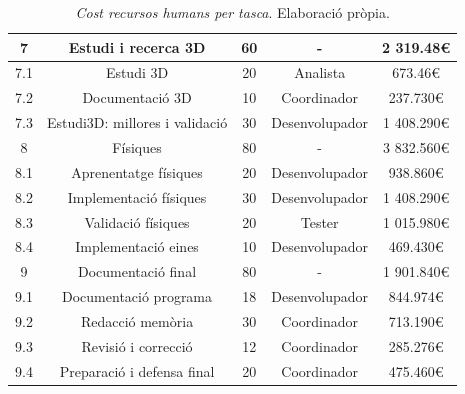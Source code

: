 \documentclass[a4paper]{article} %
\begin{document}
\begin{table}[h!]
\begin{tabular}{|| c | c || c | c | c ||}
			7 & Estudi i recerca 3D & 60 & - & 2 319.48\euro \\
			\hline
			7.1 & Estudi 3D & 20 & Analista & 673.46\euro \\ 
			7.2 & Documentació 3D & 10 & Coordinador & 237.730\euro \\
			7.3 & Estudi3D: millores i validació & 30 & Desenvolupador & 1 408.290\euro \\
			\hline \hline
			8 & Físiques & 80 &  - & 3 832.560\euro \\
			\hline
			8.1 & Aprenentatge físiques & 20 & Desenvolupador & 938.860\euro \\
			8.2 & Implementació físiques & 30 & Desenvolupador & 1 408.290\euro \\
			8.3 & Validació físiques & 20 & Tester & 1 015.980\euro \\
			8.4 & Implementació eines & 10 & Desenvolupador & 469.430\euro \\
			\hline \hline
			9 & Documentació final & 80 & - & 1 901.840\euro \\
			\hline
			9.1 & Documentació programa & 18 & Desenvolupador & 844.974\euro \\
			9.2 & Redacció memòria & 30 & Coordinador & 713.190\euro \\
			9.3 & Revisió i correcció & 12 & Coordinador & 285.276\euro \\
			9.4 & Preparació i defensa final & 20 & Coordinador & 475.460\euro \\
			\hline
		\end{tabular}
		\caption[\textit{Cost RRHH per tasca}]{\textit{\small Cost recursos humans per tasca}. Elaboració pròpia.}
		\label{table:taskCost}		
	\end{table}
\end{document}

